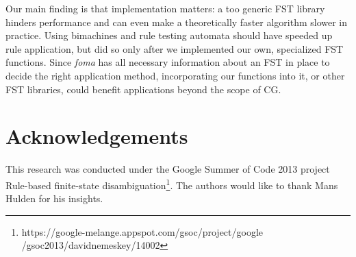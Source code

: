 \documentclass[11pt]{article}
\begin{document}
Our main finding is that implementation matters: a too generic FST library
hinders performance and can even make a theoretically faster algorithm slower
in practice. Using bimachines and rule testing automata should have speeded up
rule application, but did so only after we implemented our own, specialized
FST functions. Since \emph{foma} has all necessary information about an FST in
place to decide the right application method, incorporating our functions into
it, or other FST libraries, could benefit applications beyond the scope of CG.


\section*{Acknowledgements}
This research was conducted under the Google Summer of Code 2013 project
Rule-based finite-state disambiguation\footnote{https://google-melange.appspot.com/gsoc/project/google
/gsoc2013/davidnemeskey/14002}. The authors would like to thank Mans Hulden for
his insights.



\end{document}
